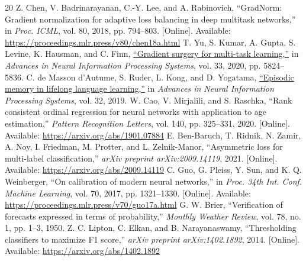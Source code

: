 \documentclass[conference]{IEEEtran}
\begin{document}
\begin{thebibliography}{20}
Z. Chen, V. Badrinarayanan, C.-Y. Lee, and A. Rabinovich, ``GradNorm: Gradient normalization for adaptive loss balancing in deep multitask networks,'' in \emph{Proc. ICML}, vol. 80, 2018, pp. 794--803. [Online]. Available: \url{https://proceedings.mlr.press/v80/chen18a.html}
T. Yu, S. Kumar, A. Gupta, S. Levine, K. Hausman, and C. Finn, \href{https://proceedings.neurips.cc/paper/2020/hash/3fe78a8acf5fda99de95303940a2420c-Abstract.html}{``Gradient surgery for multi-task learning,''} in \emph{Advances in Neural Information Processing Systems}, vol. 33, 2020, pp. 5824--5836.
C. de Masson d'Autume, S. Ruder, L. Kong, and D. Yogatama, \href{https://proceedings.neurips.cc/paper/2019/hash/f8d2e80c1458ea2501f98a2cafadb397-Abstract.html}{``Episodic memory in lifelong language learning,''} in \emph{Advances in Neural Information Processing Systems}, vol. 32, 2019.
W. Cao, V. Mirjalili, and S. Raschka, ``Rank consistent ordinal regression for neural networks with application to age estimation,'' \emph{Pattern Recognition Letters}, vol. 140, pp. 325--331, 2020. [Online]. Available: \url{https://arxiv.org/abs/1901.07884}
E. Ben-Baruch, T. Ridnik, N. Zamir, A. Noy, I. Friedman, M. Protter, and L. Zelnik-Manor, ``Asymmetric loss for multi-label classification,'' \emph{arXiv preprint arXiv:2009.14119}, 2021. [Online]. Available: \url{https://arxiv.org/abs/2009.14119}
C. Guo, G. Pleiss, Y. Sun, and K. Q. Weinberger, ``On calibration of modern neural networks,'' in \emph{Proc. 34th Int. Conf. Machine Learning}, vol. 70, 2017, pp. 1321--1330. [Online]. Available: \url{https://proceedings.mlr.press/v70/guo17a.html}
G. W. Brier, ``Verification of forecasts expressed in terms of probability,'' \emph{Monthly Weather Review}, vol. 78, no. 1, pp. 1--3, 1950.
Z. C. Lipton, C. Elkan, and B. Narayanaswamy, ``Thresholding classifiers to maximize F1 score,'' \emph{arXiv preprint arXiv:1402.1892}, 2014. [Online]. Available: \url{https://arxiv.org/abs/1402.1892}
\end{thebibliography}
\end{document}
